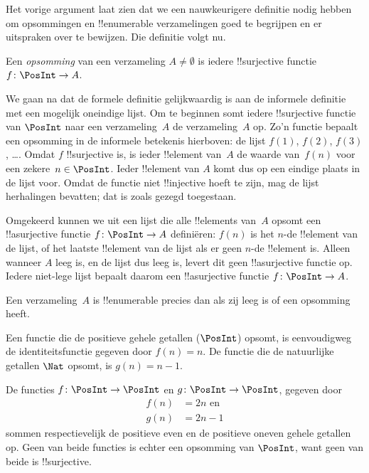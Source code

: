 \documentclass[../../../include/open-logic-section]{subfiles}
\begin{document}
Het vorige argument laat zien dat we een nauwkeurigere definitie nodig
hebben om opsommingen en !!{enumerable} verzamelingen goed te begrijpen
en er uitspraken over te bewijzen. Die definitie volgt nu.

\begin{defn} 
Een \emph{opsomming} van een verzameling $A \neq \emptyset$ is iedere
!!{surjective} functie $f \colon \PosInt \to A$.
\end{defn}

\begin{explain}
We gaan na dat de formele definitie gelijkwaardig is aan de informele
definitie met een mogelijk oneindige lijst. Om te beginnen somt iedere
!!{surjective} functie van $\PosInt$ naar een verzameling~$A$ de
verzameling~$A$ op. Zo'n functie bepaalt een opsomming in de informele
betekenis hierboven: de lijst $f(1)$, $f(2)$, $f(3)$, \dots. Omdat $f$
!!{surjective} is, is ieder !!{element} van~$A$ de waarde van~$f(n)$
voor een zekere~$n \in \PosInt$. Ieder !!{element} van $A$ komt dus op
een eindige plaats in de lijst voor. Omdat de functie niet
!!{injective} hoeft te zijn, mag de lijst herhalingen bevatten; dat is
zoals gezegd toegestaan.

Omgekeerd kunnen we uit een lijst die alle !!{element}s van~$A$ opsomt
een !!a{surjective} functie $f\colon \PosInt \to A$ definiëren: $f(n)$
is het $n$-de !!{element} van de lijst, of het laatste !!{element} van
de lijst als er geen $n$-de !!{element} is. Alleen wanneer $A$ leeg is,
en de lijst dus leeg is, levert dit geen !!a{surjective} functie op.
Iedere niet-lege lijst bepaalt daarom een !!a{surjective} functie
$f\colon \PosInt \to A$.
\end{explain}

\begin{defn}
  Een verzameling~$A$ is !!{enumerable} precies dan als zij leeg is of
  een opsomming heeft.
\end{defn}

\begin{ex}
Een functie die de positieve gehele getallen ($\PosInt$) opsomt, is
eenvoudigweg de identiteitsfunctie gegeven door $f(n) = n$. De functie
die de natuurlijke getallen $\Nat$ opsomt, is $g(n) = n - 1$.
\end{ex}

\begin{ex}
De functies $f\colon \PosInt \to \PosInt$ en $g \colon \PosInt \to
\PosInt$, gegeven door
\begin{align*}
f(n) & = 2n \text{ en}\\
g(n) & = 2n - 1
\end{align*}
sommen respectievelijk de positieve even en de positieve oneven gehele
getallen op. Geen van beide functies is echter een opsomming van
$\PosInt$, want geen van beide is !!{surjective}.
\end{ex}
\end{document}
